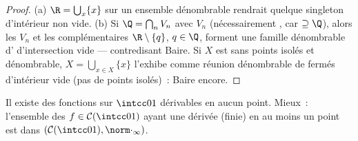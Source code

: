 \begin{proof}
(a) $\R = \bigcup_{x}\{x\}$ sur un ensemble dénombrable
rendrait quelque singleton d'intérieur non vide. (b) Si $\Q =
\bigcap_n V_n$ avec $V_n$  (nécessairement , car
$\supseteq \Q$), alors les $V_n$ et les complémentaires
$\R\setminus\{q\}$, $q \in \Q$, forment une famille dénombrable
d'  d'intersection vide --- contredisant Baire.
Si $X$ est  sans points isolés et dénombrable, $X =
\bigcup_{x \in X}\{x\}$ l'exhibe comme réunion dénombrable de
fermés d'intérieur vide (pas de points isolés)~: Baire encore.
\end{proof}

\begin{theorem}
\label{thm:b3:complete:nowherediff}
Il existe des fonctions  sur $\intcc01$ dérivables en
aucun point. Mieux~: l'ensemble des $f \in \mathcal
C(\intcc01)$ ayant une dérivée (finie) en au moins un point est
 dans $(\mathcal C(\intcc01), \norm\cdot_\infty)$.%
\end{theorem}

